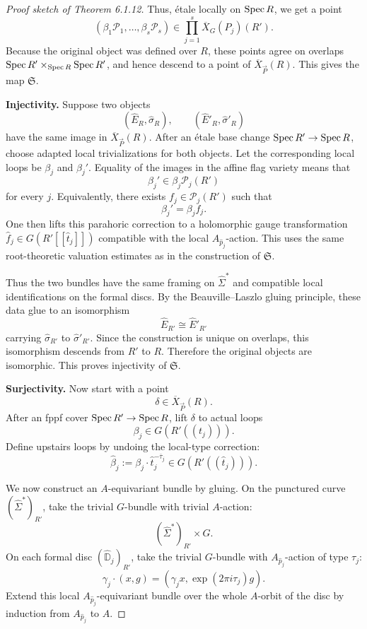 \documentclass[12pt]{article}
\begin{document}
\begin{proof}[Proof sketch of Theorem 6.1.12]
Thus, étale locally on $\operatorname{Spec} R$, we get a point
\[
(\beta_1\mathcal P_1,\dots,\beta_s\mathcal P_s)
\in
\prod_{j=1}^s \overline X_G(P_j)(R').
\]
Because the original object was defined over $R$, these points agree on overlaps $\operatorname{Spec} R'\times_{\operatorname{Spec} R}\operatorname{Spec} R'$, and hence descend to a point of $\overline X_{\vec P}(R)$. This gives the map $\mathfrak S$.

\medskip

\noindent\textbf{Injectivity.}
Suppose two objects
\[
(\widehat E_R,\widehat\sigma_R),
\qquad
(\widehat E'_R,\widehat\sigma'_R)
\]
have the same image in $\overline X_{\vec P}(R)$. After an étale base change $\operatorname{Spec} R'\to \operatorname{Spec} R$, choose adapted local trivializations for both objects. Let the corresponding local loops be $\beta_j$ and $\beta_j'$. Equality of the images in the affine flag variety means that
\[
\beta_j' \in \beta_j\mathcal P_j(R')
\]
for every $j$. Equivalently, there exists $f_j\in \mathcal P_j(R')$ such that
\[
\beta_j'=\beta_j f_j.
\]
One then lifts this parahoric correction to a holomorphic gauge transformation $\widehat f_j\in G(R'[[\widehat t_j]])$ compatible with the local $A_{\widehat p_j}$-action. This uses the same root-theoretic valuation estimates as in the construction of $\mathfrak S$.

Thus the two bundles have the same framing on $\widehat\Sigma^*$ and compatible local identifications on the formal discs. By the Beauville--Laszlo gluing principle, these data glue to an isomorphism
\[
\widehat E_{R'}\cong \widehat E'_{R'}
\]
carrying $\widehat\sigma_{R'}$ to $\widehat\sigma'_{R'}$. Since the construction is unique on overlaps, this isomorphism descends from $R'$ to $R$. Therefore the original objects are isomorphic. This proves injectivity of $\mathfrak S$.

\medskip

\noindent\textbf{Surjectivity.}
Now start with a point
\[
\delta\in \overline X_{\vec P}(R).
\]
After an fppf cover $\operatorname{Spec} R'\to \operatorname{Spec} R$, lift $\delta$ to actual loops
\[
\beta_j\in G(R'((t_j))).
\]
Define upstairs loops by undoing the local-type correction:
\[
\widehat\beta_j:=\beta_j\cdot \widehat t_j^{-\overline\tau_j}
\in G(R'((\widehat t_j))).
\]

We now construct an $A$-equivariant bundle by gluing. On the punctured curve $(\widehat\Sigma^*)_{R'}$, take the trivial $G$-bundle with trivial $A$-action:
\[
(\widehat\Sigma^*)_{R'}\times G.
\]
On each formal disc $(\widehat{\mathbb D}_j)_{R'}$, take the trivial $G$-bundle with $A_{\widehat p_j}$-action of type $\tau_j$:
\[
\gamma_j\cdot(x,g)
=
(\gamma_jx,\exp(2\pi i\tau_j)g).
\]
Extend this local $A_{\widehat p_j}$-equivariant bundle over the whole $A$-orbit of the disc by induction from $A_{\widehat p_j}$ to $A$.


\end{proof}
\end{document}
